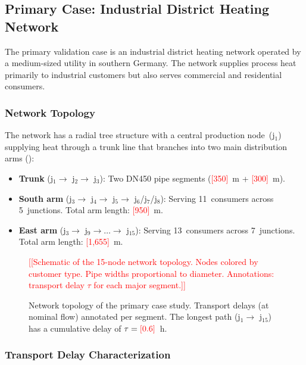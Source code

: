 \documentclass[review,3p]{elsarticle}
\newcommand{\placeholder}[1]{\textcolor{red}{[#1]}}
\begin{document}
\subsection{Primary Case: Industrial District Heating Network}
\label{sec:case_stadtbach}

The primary validation case is an industrial district heating network
operated by a medium-sized utility in southern Germany. The network
supplies process heat primarily to industrial customers but also
serves commercial and residential consumers.

\subsubsection{Network Topology}
\label{sec:case_topology}

The network has a radial tree structure with a central production
node~(j$_1$) supplying heat through a trunk line that branches into
two main distribution arms ():

\begin{itemize}[nosep]
    \item \textbf{Trunk} (j$_1 \rightarrow$ j$_2 \rightarrow$ j$_3$):
    Two DN450 pipe segments (\placeholder{350}~m + \placeholder{300}~m).

    \item \textbf{South arm} (j$_3 \rightarrow$ j$_4 \rightarrow$
    j$_5 \rightarrow$ j$_6$/j$_7$/j$_8$): Serving 11~consumers
    across 5~junctions. Total arm length: \placeholder{950}~m.

    \item \textbf{East arm} (j$_3 \rightarrow$ j$_9 \rightarrow
    \ldots \rightarrow$ j$_{15}$): Serving 13~consumers across
    7~junctions. Total arm length: \placeholder{1,655}~m.
\end{itemize}

\begin{figure}[htbp]
\centering
\placeholder{[Schematic of the 15-node network topology. Nodes
colored by customer type. Pipe widths proportional to diameter.
Annotations: transport delay $\tau$ for each major segment.]}
\caption{Network topology of the primary case study. Transport
delays (at nominal flow) annotated per segment. The longest path
(j$_1 \to$ j$_{15}$) has a cumulative delay of
$\tau = \placeholder{0.6}$~h.}
\label{fig:topology}
\end{figure}

\subsubsection{Transport Delay Characterization}
\label{sec:case_delays}
\end{document}
